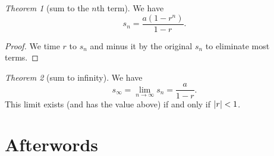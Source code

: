 \documentclass[8pt]{article}
\theoremstyle{remark}
\newtheorem{theorem}{Theorem}[section]
\begin{document}
        \begin{theorem}[sum to the $n$th term]
            We have
            $$
                s_n = \frac{a (1 - r^n)}{1 - r}.
            $$
            \begin{proof}
                We time $r$ to $s_n$ and minus it by the original $s_n$ to eliminate most terms.
            \end{proof}
        \end{theorem}

        \begin{theorem}[sum to infinity]
            We have
            $$
                s_\infty = \lim_{n \rightarrow \infty} s_n = \frac{a}{1 - r}.
            $$
            This limit exists (and has the value above) if and only if $\left\lvert r \right\rvert<1$.
        \end{theorem}

    \section*{Afterwords}

        
\end{document}
